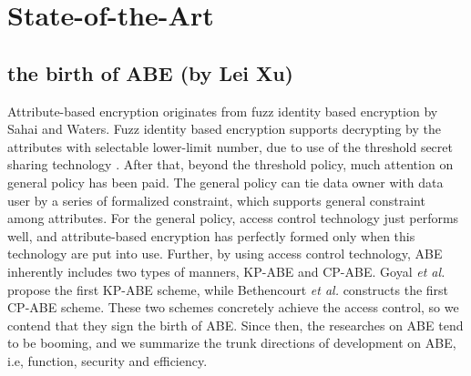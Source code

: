 \section{State-of-the-Art}
\subsection{the birth of ABE (by Lei Xu)}
Attribute-based encryption originates from fuzz identity based encryption \cite{Sahai:EUROCRYPT'05} by Sahai and Waters.
Fuzz identity based encryption supports decrypting by the attributes with selectable lower-limit number,
due to use of the threshold secret sharing technology \cite{Shamir:CACM'79}.
After that, beyond the threshold policy, much attention on general policy has been paid.
The general policy can tie data owner with data user by a series of formalized constraint,
which supports general constraint among attributes.
For the general policy, access control technology just performs well,
and attribute-based encryption has perfectly formed only when this technology are put into use.
Further, by using access control technology, ABE inherently includes two types of manners, KP-ABE and CP-ABE.
Goyal \emph{et al.} \cite{Goyal:CCS'06} propose the first KP-ABE scheme,
while Bethencourt \emph{et al.} \cite{Bethencourt:SP'07} constructs the first CP-ABE scheme.
These two schemes concretely achieve the access control,
so we contend that they sign the birth of ABE.
Since then, the researches on ABE tend to be booming,
and we summarize the trunk directions of development on ABE,
i.e, function, security and efficiency.
